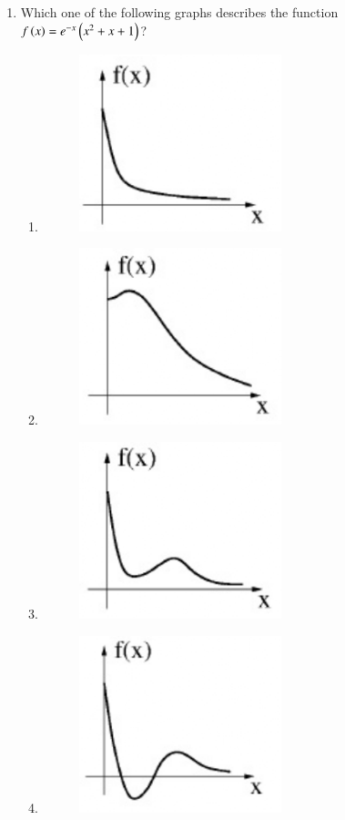 \documentclass[a4paper, 11pt]{article}
\begin{document}
\begin{enumerate}
    \item Which one of the following graphs describes the function $f\left(x\right)=e^{-x}\left(x^{2}+x+1\right)$?
    \begin{enumerate}
        \item \begin{figure}[H]\centering\includegraphics[width=0.4\columnwidth]{figs/q38A.png}\end{figure}
        \item \begin{figure}[H]\centering\includegraphics[width=0.4\columnwidth]{figs/q38B.png}\end{figure}
        \item \begin{figure}[H]\centering\includegraphics[width=0.4\columnwidth]{figs/q38C.png}\end{figure}
        \item \begin{figure}[H]\centering\includegraphics[width=0.4\columnwidth]{figs/q38D.png}\end{figure}
    \end{enumerate}
    

\end{enumerate}
\end{document}
